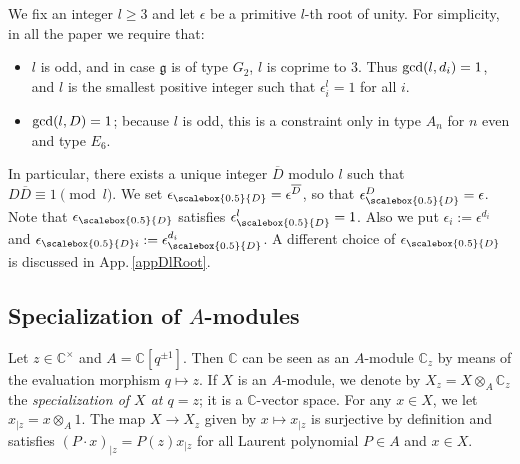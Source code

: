 \documentclass[11pt]{amsart}
\newcommand{\e}{\epsilon}
\newcommand{\eD}{\epsilon_{\scalebox{0.5}{D}}}
\newcommand{\eDi}{\epsilon_{\scalebox{0.5}{D}i}}
\begin{document}
\indent We fix an integer $l\geq 3$ and let $\e$ be a primitive $l$-th root of unity. For simplicity, in all the paper we require that:
\begin{itemize}
\item $l$ is odd, and in case $\mathfrak{g}$ is of type $G_2$, $l$ is coprime to $3$. Thus ${\rm gcd}(l,d_i)=1$, and $l$ is the smallest positive integer such that $\epsilon_i^l=1$ for all $i$. 
\item ${\rm gcd}(l,D)=1$; because $l$ is odd, this is a constraint only in type $A_{n}$ for $n$ even and type $E_6$.
\end{itemize}
In particular, there exists a unique integer $\overline{D}$ modulo $l$ such that $D\overline{D} \equiv 1 \pmod{l}$. We set $\e_{\scalebox{0.5}{D}} = \epsilon^{\overline{D}}$, so that $\eD^D = \e$. Note that $\eD$ satisfies $\eD^l =1$. Also we put $\e_i:=\e^{d_i}$ and $\eDi:=\eD^{d_i}$. A different choice of $\eD$ is discussed in App.\,\ref{appDlRoot}.

\subsection{Specialization of \texorpdfstring{$A$}{A}-modules}\label{generalRmkSpe}
Let $z \in \mathbb{C}^\times$ and $A = \mathbb{C}[q^{\pm 1}]$. Then $\mathbb{C}$ can be seen as an $A$-module $\mathbb{C}_z$ by means of the evaluation morphism $q \mapsto z$. If $X$ is an $A$-module, we denote by $X_z = X \otimes_A \mathbb{C}_z$ the {\em specialization of $X$ at $q=z$}; it is a $\mathbb{C}$-vector space. For any $x \in X$, we let $x_{|z} = x \otimes_A 1$. The map $X \to X_z$ given by $x \mapsto x_{|z}$ is surjective by definition and satisfies $(P \cdot x)_{|z} = P(z)x_{|z}$ for all Laurent polynomial $P \in A$ and $x \in X$.
\end{document}
